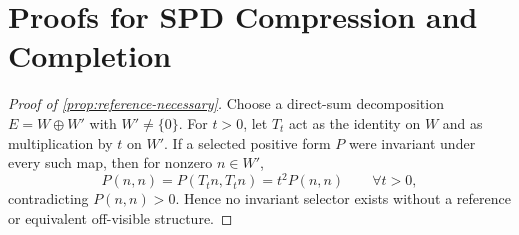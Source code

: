\section{Proofs for SPD Compression and Completion}
\label{app:spd-proofs}

\begin{proof}[Proof of \cref{prop:reference-necessary}]
Choose a direct-sum decomposition \(E=W\oplus W'\) with \(W'\ne\{0\}\).
For \(t>0\), let \(T_t\) act as the identity on \(W\) and as multiplication
by \(t\) on \(W'\).  If a selected positive form \(P\) were invariant under
every such map, then for nonzero \(n\in W'\),
\[
  P(n,n)=P(T_tn,T_tn)=t^2P(n,n)
  \qquad\forall t>0,
\]
contradicting \(P(n,n)>0\).  Hence no invariant selector exists without a
reference or equivalent off-visible structure.
\end{proof}

